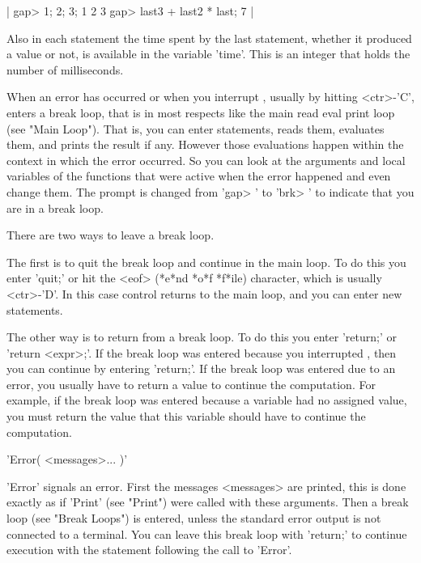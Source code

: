 |    gap> 1; 2; 3;
    1
    2
    3
    gap> last3 + last2 * last;
    7 |

Also in each statement the time spent by the  last  statement, whether it
produced a value or not, is available in the variable 'time'.  This is an
integer that holds the number of milliseconds.

%

When  an  error  has  occurred  or when you  interrupt {\GAP}, usually by
hitting <ctr>-'C', {\GAP} enters a break loop,  that is in most  respects
like the main read  eval print loop  (see "Main Loop").  That is, you can
enter  statements,  {\GAP} reads  them, evaluates  them,  and prints  the
result if  any.  However those  evaluations  happen within the context in
which the error  occurred.   So you can look at the  arguments and  local
variables of the functions that were active  when the error happened  and
even change  them.   The  prompt is changed  from 'gap> ' to  'brk>  ' to
indicate that you are in a break loop.

There are two ways to leave a break loop.

The first is to quit the break loop and continue in the main loop.  To do
this  you enter 'quit;'  or hit the <eof>  (*e*nd *o*f *f*ile) character,
which is usually <ctr>-'D'.   In this  case  control returns to  the main
loop, and you can enter new statements.

The other way is  to return  from a  break loop.  To  do this  you  enter
'return;' or 'return <expr>;'.  If the break loop was entered because you
interrupted {\GAP}, then you can continue by entering  'return;'.  If the
break loop was  entered due to  an error, you  usually have  to  return a
value to continue the computation.   For example,  if the break  loop was
entered because a  variable  had no assigned  value, you  must return the
value that this variable should have to continue the computation.

%

'Error( <messages>... )'

'Error' signals  an  error.  First  the messages <messages> are  printed,
this  is done exactly as if 'Print' (see "Print") were  called with these
arguments.  Then a break loop (see "Break Loops") is  entered, unless the
standard error output is not connected to a terminal.  You can leave this
break  loop  with 'return;'  to  continue execution  with  the  statement
following the call to 'Error'.

